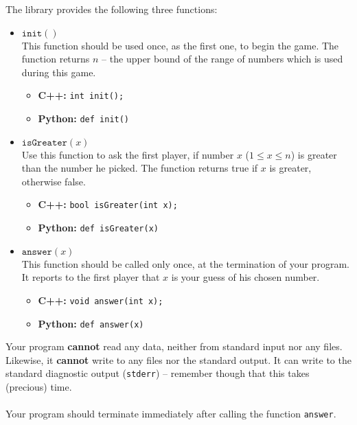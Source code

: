 \documentclass{spiral}
\begin{document}
    \medskip\noindent
    The library provides the following three functions:
    \begin{itemize}
        \item $\texttt{init}()$ \\
            This function should be used once, as the first one, to begin the game.
            The function returns $n$ -- the upper bound of the range of numbers 
            which is used during this game.
            \begin{itemize}
                \item \textbf{C++:}
		                \texttt{int init();}

                \item \textbf{Python:}
		                \texttt{def init()}
            \end{itemize}

        \item $\texttt{isGreater}(x)$ \\
            Use this function to ask the first player,
            if number $x$ ($1 \leq x \leq n$)
            is greater than the number he picked.
            The function returns true if $x$ is greater, otherwise false.
            \begin{itemize}
                \item \textbf{C++:}
		                \texttt{bool isGreater(int x);}

                \item \textbf{Python:}
		                \texttt{def isGreater(x)}
            \end{itemize}

        \item $\texttt{answer}(x)$ \\
            This function should be called only once,
            at the termination of your program.
            It reports to the first player that $x$
            is your guess of his chosen number.
            \begin{itemize}
                \item \textbf{C++:}
		                \texttt{void answer(int x);}
                \item \textbf{Python:}
		                \texttt{def answer(x)}
            \end{itemize}
    \end{itemize}

    \noindent Your program \textbf{cannot} read any data,
    neither from standard input nor any files.
    Likewise, it \textbf{cannot} write to any files nor the standard output.
    It can write to the standard diagnostic output (\texttt{stderr}) -- remember
    though that this takes (precious) time.\\
    \\
    Your program should terminate immediately
    after calling the function \texttt{answer}.
\end{document}
